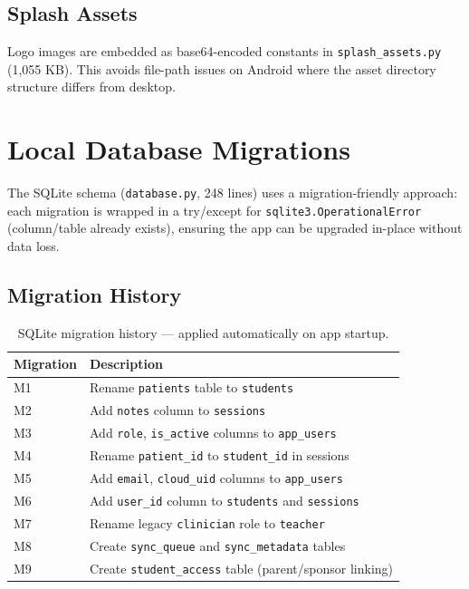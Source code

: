 \documentclass[12pt,a4paper]{article}
\begin{document}
\subsection{Splash Assets}

Logo images are embedded as base64-encoded constants in \texttt{splash\_assets.py} (1,055 KB). This avoids file-path issues on Android where the asset directory structure differs from desktop.

\section{Local Database Migrations}

The SQLite schema (\texttt{database.py}, 248 lines) uses a migration-friendly approach: each migration is wrapped in a try/except for \texttt{sqlite3.OperationalError} (column/table already exists), ensuring the app can be upgraded in-place without data loss.

\subsection{Migration History}

\begin{table}[H]
\centering
\begin{tabular}{@{}lL{9cm}@{}}
\toprule
\textbf{Migration} & \textbf{Description} \\
\midrule
M1 & Rename \texttt{patients} table to \texttt{students} \\
M2 & Add \texttt{notes} column to \texttt{sessions} \\
M3 & Add \texttt{role}, \texttt{is\_active} columns to \texttt{app\_users} \\
M4 & Rename \texttt{patient\_id} to \texttt{student\_id} in sessions \\
M5 & Add \texttt{email}, \texttt{cloud\_uid} columns to \texttt{app\_users} \\
M6 & Add \texttt{user\_id} column to \texttt{students} and \texttt{sessions} \\
M7 & Rename legacy \texttt{clinician} role to \texttt{teacher} \\
M8 & Create \texttt{sync\_queue} and \texttt{sync\_metadata} tables \\
M9 & Create \texttt{student\_access} table (parent/sponsor linking) \\
\bottomrule
\end{tabular}
\caption{SQLite migration history — applied automatically on app startup.}
\end{table}
\end{document}
